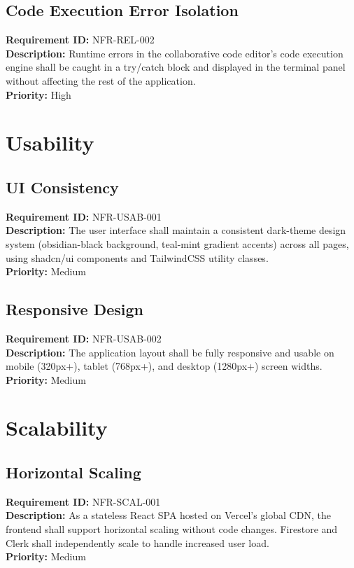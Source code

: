 \documentclass{fisatinternship}
\begin{document}
\vspace{0.3cm}

\subsection{Code Execution Error Isolation}
\textbf{Requirement ID:} NFR-REL-002\\
\textbf{Description:} Runtime errors in the collaborative code editor's code execution
engine shall be caught in a try/catch block and displayed in the terminal panel without
affecting the rest of the application.\\
\textbf{Priority:} High

\section{Usability}

\subsection{UI Consistency}
\textbf{Requirement ID:} NFR-USAB-001\\
\textbf{Description:} The user interface shall maintain a consistent dark-theme design
system (obsidian-black background, teal-mint gradient accents) across all pages, using
shadcn/ui components and TailwindCSS utility classes.\\
\textbf{Priority:} Medium

\vspace{0.3cm}

\subsection{Responsive Design}
\textbf{Requirement ID:} NFR-USAB-002\\
\textbf{Description:} The application layout shall be fully responsive and usable on
mobile (320px+), tablet (768px+), and desktop (1280px+) screen widths.\\
\textbf{Priority:} Medium

\section{Scalability}

\subsection{Horizontal Scaling}
\textbf{Requirement ID:} NFR-SCAL-001\\
\textbf{Description:} As a stateless React SPA hosted on Vercel's global CDN, the frontend
shall support horizontal scaling without code changes. Firestore and Clerk shall independently
scale to handle increased user load.\\
\textbf{Priority:} Medium
\end{document}
